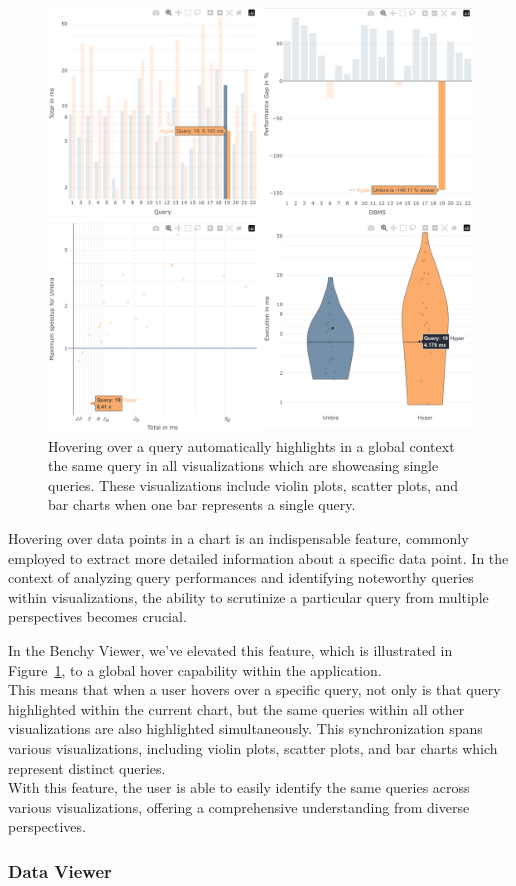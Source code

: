 \begin{figure}[h]
  \centering
  \includegraphics[width=0.6\linewidth]{figures/hover-group.png}
  \caption{Hovering over a query automatically highlights in a global context the same query in all visualizations which are showcasing single queries. These visualizations include violin plots, scatter plots, and bar charts when one bar represents a single query.}
  \label{fig:hover-group}
\end{figure}

Hovering over data points in a chart is an indispensable feature, commonly employed to extract more detailed information about a specific data point. In the context of analyzing query performances and identifying noteworthy queries within visualizations, the ability to scrutinize a particular query from multiple perspectives becomes crucial.


 In the Benchy Viewer, we've elevated this feature, which is illustrated in Figure~\ref{fig:hover-group}, to a global hover capability within the application.\\
 This means that when a user hovers over a specific query, not only is that query highlighted within the current chart, but the same queries within all other visualizations are also highlighted simultaneously. This synchronization spans various visualizations, including violin plots, scatter plots, and bar charts which represent distinct queries.\\
 With this feature, the user is able to easily identify the same queries across various visualizations, offering a comprehensive understanding from diverse perspectives.



\subsubsection{Data Viewer}

